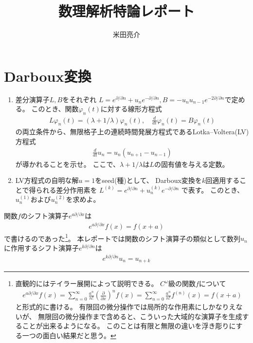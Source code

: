 \documentclass{jsarticle}
\begin{document}
\title{数理解析特論レポート}
\author{米田亮介}
\date{}
\maketitle
\section{Darboux変換}
\begin{shaded}
\begin{enumerate}
\item 差分演算子$L,B$をそれぞれ
$L=e^{\partial/\partial n}+u_{n}e^{-\partial/\partial n},
B=-u_{n}u_{n-1}e^{-2\partial/\partial n}$で定める。
このとき、関数$\varphi_{n}(t)$に対する線形方程式
\begin{align}
L\varphi_{n}(t)=(\lambda+1/\lambda)\varphi_{n}(t),\quad
\frac{d}{dt}\varphi_{n}(t)=B\varphi_{n}(t)
\end{align}
の両立条件から、無限格子上の連続時間発展方程式であるLotka--Voltera(LV)方程式
\begin{align}
\frac{d}{dt}u_{n}=u_{n}(u_{n+1}-u_{n-1})
\end{align}
が導かれることを示せ。
ここで、$\lambda+1/\lambda$は$L$の固有値を与える定数。
\item LV方程式の自明な解$u=1$をseed(種)として、
Darboux変換を$k$回適用することで得られる差分作用素を
$L^{(k)}=e^{\partial/\partial n}+u_{n}^{(k)}e^{-\partial/\partial n}$
で表す。
このとき、$u_{n}^{(1)}$および$u_{n}^{(2)}$を求めよ。
\end{enumerate}
\end{shaded}
関数$f$のシフト演算子$e^{a\partial/\partial x}$は
\begin{align}
e^{a\partial/\partial x}f(x)=f(x+a)
\end{align}
で書けるのであった\footnote{
	直観的にはテイラー展開によって説明できる。
	$C^{\omega}$級の関数$f$について
	\begin{align*}
		e^{a\partial/\partial x}f(x)
		=\sum_{n=0}^{\infty}\frac{a^{n}}{n!}\left(\frac{\partial}{\partial x}\right)^{n}f(x)
		=\sum_{n=0}^{\infty}\frac{a^{n}}{n!}f^{(n)}(x)
		=f(x+a)
	\end{align*}
	と形式的に書ける。
	有限回の微分操作では局所的な作用素にしかなりえないが、
	無限回の微分操作まで含めると、こういった大域的な演算子を生成することが出来るようになる。
	このことは有限と無限の違いを浮き彫りにする一つの面白い結果だと思う。
}。
本レポートでは関数のシフト演算子の類似として数列$u_{n}$に作用するシフト演算子$e^{k\partial/\partial n}$は
\begin{align}
e^{k\partial/\partial n}u_{n}=u_{n+k}
\end{align}
\end{document}
